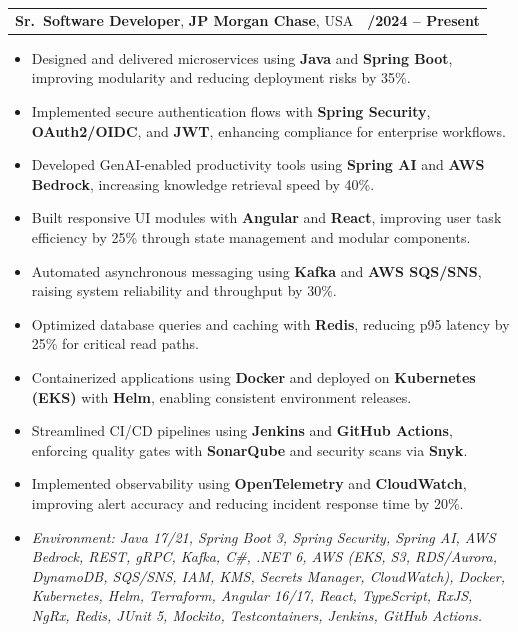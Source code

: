 \documentclass[letterpaper,11pt]{article}
\makeatletter
\newcommand{\resumeItem}[1]{
  \item\footnotesize{
    {#1 \vspace{-2pt}}
  }
}
\newcommand{\resumeSubheading}[4]{
  \vspace{-2pt}\item
    \begin{tabular*}{1.0\textwidth}[t]{l@{\extracolsep{\fill}}r}
      \textbf{\fontsize{10pt}{14pt}\selectfont #3}, \textbf{\fontsize{10pt}{14pt}\selectfont #1}, \fontsize{10pt}{14pt}\selectfont #4 & \textbf{\fontsize{10pt}{14pt}\selectfont #2} \\
    \end{tabular*}\vspace{-7pt}
}
\newcommand{\resumeItemListStart}{\begin{itemize}[leftmargin=*]}
\newcommand{\resumeItemListEnd}{\end{itemize}\vspace{-5pt}}
\makeatother
\begin{document}
\resumeSubheading
{JP Morgan Chase}{09/2024 -- Present}
{Sr.\ Software Developer}{USA}
\resumeItemListStart
  \resumeItem{Designed and delivered microservices using \textbf{Java} and \textbf{Spring Boot}, improving modularity and reducing deployment risks by 35\%.}
  \resumeItem{Implemented secure authentication flows with \textbf{Spring Security}, \textbf{OAuth2/OIDC}, and \textbf{JWT}, enhancing compliance for enterprise workflows.}
  \resumeItem{Developed GenAI-enabled productivity tools using \textbf{Spring AI} and \textbf{AWS Bedrock}, increasing knowledge retrieval speed by 40\%.}
  \resumeItem{Built responsive UI modules with \textbf{Angular} and \textbf{React}, improving user task efficiency by 25\% through state management and modular components.}
  \resumeItem{Automated asynchronous messaging using \textbf{Kafka} and \textbf{AWS SQS/SNS}, raising system reliability and throughput by 30\%.}
  \resumeItem{Optimized database queries and caching with \textbf{Redis}, reducing p95 latency by 25\% for critical read paths.}
  \resumeItem{Containerized applications using \textbf{Docker} and deployed on \textbf{Kubernetes (EKS)} with \textbf{Helm}, enabling consistent environment releases.}
  \resumeItem{Streamlined CI/CD pipelines using \textbf{Jenkins} and \textbf{GitHub Actions}, enforcing quality gates with \textbf{SonarQube} and security scans via \textbf{Snyk}.}
  \resumeItem{Implemented observability using \textbf{OpenTelemetry} and \textbf{CloudWatch}, improving alert accuracy and reducing incident response time by 20\%.}
  \resumeItem{\textit{Environment: Java 17/21, Spring Boot 3, Spring Security, Spring AI, AWS Bedrock, REST, gRPC, Kafka, C\#, .NET 6, AWS (EKS, S3, RDS/Aurora, DynamoDB, SQS/SNS, IAM, KMS, Secrets Manager, CloudWatch), Docker, Kubernetes, Helm, Terraform, Angular 16/17, React, TypeScript, RxJS, NgRx, Redis, JUnit 5, Mockito, Testcontainers, Jenkins, GitHub Actions.}}
\resumeItemListEnd
\end{document}
